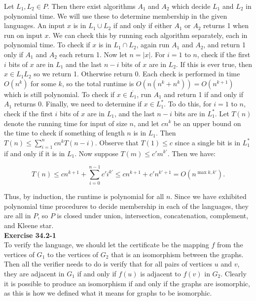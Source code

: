 \documentclass{article}
\begin{document}
Let $L_1, L_2 \in P$.  Then there exist algorithms $A_1$ and $A_2$ which decide $L_1$ and $L_2$ in polynomial time. We will use these to determine membership in the given languages.  An input $x$ is in $L_1 \cup L_2$ if and only if either $A_1$ or $A_2$ returns 1 when run on input $x$. We can check this by running each algorithm separately, each in polynomial time. To check if $x$ is in $L_1 \cap L_2$, again run $A_1$ and $A_2$, and return 1 only if $A_1$ and $A_2$ each return 1. Now let $n = |x|$.  For $i=1$ to $n$, check if the first $i$ bits of $x$ are in $L_1$ and the last $n-i$ bits of $x$ are in $L_2$.  If this is ever true, then $x \in L_1L_2$ so we return 1. Otherwise return 0.  Each check is performed in time $O(n^k)$ for some $k$, so the total runtime is $O(n(n^k + n^k)) = O(n^{k+1})$ which is still polynomial.  To check if $x \in \overline{L_1}$, run $A_1$ and return 1 if and only if $A_1$ returns 0.  Finally, we need to determine if $x \in L_1^*$.  To do this, for $i=1$ to $n$, check if the first $i$ bits of $x$ are in $L_1$, and the last $n-i$ bits are in $L_1^*$.  Let $T(n)$ denote the running time for input of size $n$, and let $cn^k$ be an upper bound on the time to check if something of length $n$ is in $L_1$.  Then $T(n) \leq \sum_{i=1}^n cn^k T(n-i)$.  Observe that $T(1) \leq c$ since a single bit is in $L_1^*$ if and only if it is in $L_1$.  Now suppose $T(m) \leq c'm^{k'}$.  Then we have:

\[ T(n) \leq cn^{k+1} + \sum_{i=0}^{n-1} c'i^{k'} \leq cn^{k+1} + c'n^{k'+1} = O(n^{\max{k, k'}}).\]

Thus, by induction, the runtime is polynomial for all $n$.  Since we have exhibited polynomial time procedures to decide membership in each of the languages, they are all in $P$, so $P$ is closed under union, intersection, concatenation, complement, and Kleene star. \\

\noindent\textbf{Exercise 34.2-1}\\

To verify the language, we should let the certificate be the mapping $f$ from the vertices of $G_1$ to the vertices of $G_2$ that is an isomorphism between the graphs. Then all the verifier needs to do is verify that for all pairs of vertices $u$ and $v$, they are adjacent in $G_1$ if and only if $f(u)$ is adjacent to $f(v)$ in $G_2$. Clearly it is possible to produce an isomorphism if and only if the graphs are isomorphic, as this is how we defined what it means for graphs to be isomorphic.\\
\end{document}
